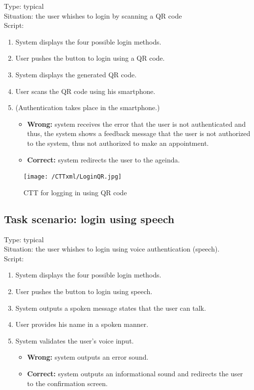 \documentclass[11pt, a4paper,svglistings]{report}
\begin{document}
Type: typical \\
Situation: the user whishes to login by scanning a QR code \\
Script:
\begin{enumerate}
\item System displays the four possible login methods.
\item User pushes the button to login using a QR code.
\item System displays the generated QR code.
\item User scans the QR code using his smartphone.
\item (Authentication takes place in the smartphone.)
\begin{itemize}
\item \textbf{Wrong:} system receives the error that the user is not authenticated and thus, the system shows a feedback message that the user is not authorized to the system, thus not authorized to make an appointment.
\item \textbf{Correct:} system redirects the user to the ageinda.
\end{itemize}
\end{enumerate}

\begin{figure}[H]
\centering
    \texttt{[image: /CTTxml/LoginQR.jpg]}
  \caption[QR code login CTT]{CTT for logging in using QR code}
\end{figure}


\subsection{\label{subsec:loginSpeech}Task scenario: login using speech}

Type: typical \\
Situation: the user whishes to login using voice authentication (speech). \\
Script:
\begin{enumerate}
\item System displays the four possible login methods.
\item User pushes the button to login using speech.
\item System outputs a spoken message states that the user can talk.
\item User provides his name in a spoken manner.
\item System validates the user's voice input.
\begin{itemize}
\item \textbf{Wrong:} system outputs an error sound.
\item \textbf{Correct:} system outputs an informational sound and redirects the user to the  confirmation screen.
\end{itemize}
\end{enumerate}
\end{document}
